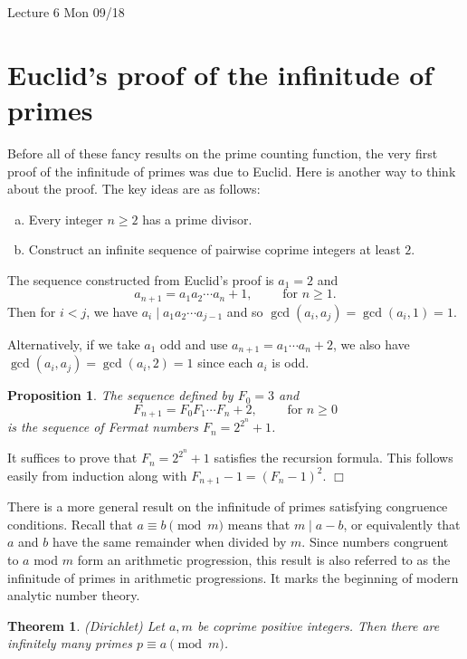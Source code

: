 \documentclass{article}
\newtheorem{theorem}[subsection]{Theorem}
\newtheorem{proposition}[subsection]{Proposition}
\newenvironment{proof}{\noindent {\bf Proof:}}{$\Box$ \vspace{2 ex}}
\newcommand{\add}[1]{{\color{blue} #1}}
\begin{document}
\begin{center}
    \add{Lecture 6 Mon 09/18}
\end{center}
\section{Euclid's proof of the infinitude of primes}

Before all of these fancy results on the prime counting function, the very first proof of the infinitude of primes was due to Euclid. Here is another way to think about the proof. The key ideas are as follows:
\begin{enumerate}[(a)]
    \item Every integer $n\geq 2$ has a prime divisor.
    \item Construct an infinite sequence of pairwise coprime integers at least $2$.
\end{enumerate}
The sequence constructed from Euclid's proof is $a_1 = 2$ and 
$$a_{n+1} = a_1a_2\cdots a_n + 1,\qquad\mbox{ for }n\geq1.$$
Then for $i < j$, we have $a_i\mid a_1a_2\cdots a_{j-1}$ and so $\gcd(a_i,a_j) = \gcd(a_i, 1) = 1.$

Alternatively, if we take $a_1$ odd and use $a_{n+1} = a_1\cdots a_n + 2$, we also have $\gcd(a_i,a_j) = \gcd(a_i,2) = 1$ since each $a_i$ is odd.

\begin{proposition}
    The sequence defined by $F_0 = 3$ and $$F_{n+1} = F_0F_1\cdots F_n + 2,\qquad\mbox{ for }n\geq 0$$
    is the sequence of Fermat numbers $F_n = 2^{2^n}+1$.
\end{proposition}

\begin{proof}
    It suffices to prove that $F_n = 2^{2^n}+1$ satisfies the recursion formula. This follows easily from induction along with $F_{n+1} - 1 = (F_n - 1)^2$.
\end{proof}

There is a more general result on the infinitude of primes satisfying congruence conditions. Recall that $a\equiv b\pmod{m}$ means that $m\mid a - b$, or equivalently that $a$ and $b$ have the same remainder when divided by $m$. Since numbers congruent to $a$ mod $m$ form an arithmetic progression, this result is also referred to as the infinitude of primes in arithmetic progressions. It marks the beginning of modern analytic number theory.

\begin{theorem}
    (Dirichlet) Let $a,m$ be coprime positive integers. Then there are infinitely many primes $p\equiv a\pmod{m}$.
\end{theorem}
\end{document}
